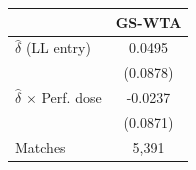 \begin{tabular}{lc}
\toprule
 & GS-WTA \\
\midrule
$\hat{\delta}$ (LL entry) & 0.0495 \\
 & (0.0878) \\
$\hat{\delta}$ $\times$ Perf. dose & -0.0237 \\
 & (0.0871) \\
\midrule
Matches & 5,391 \\
\bottomrule
\end{tabular}
